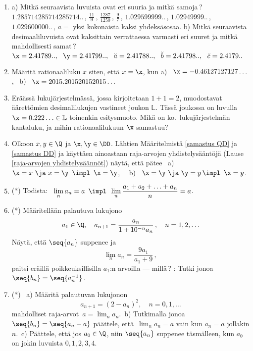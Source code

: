 \begin{enumerate}
\item 
a) Mitkä seuraavista luvuista ovat eri suuria ja mitkä samoja\,? \newline
$1.285714285714285714..\,$, $\frac{11}{9}\,$, $\frac{1287}{1250}\,$, $\frac{9}{7}\,$, 
$1.029599999..\,$, $1.02949999..\,$, \newline
$1.029600000..\,$, $a=$ yksi kokonaista kaksi yhdeksäsosaa. \vspace{2mm}\newline
b) Mitkä seuraavista desimaaliluvuista ovat kaksittain verrattaessa varmasti eri suuret ja mitkä
mahdollisesti samat\,? \newline
$\x=2.41789..,\ \ \y=2.41799..,\ \ \breve{a}=2.41788..,\ \ \breve{b}=2.41798.., \ \ 
 \breve{c}=2.4179..$

\item
Määritä rationaaliluku $x$ siten, että $x=\x$, kun \newline
a) \ $\x=-0.46127127127 \ldots\,$, \ b) \ $\x=2015.201520152015 \ldots$

\item
Eräässä lukujärjestelmässä, jossa kirjoitetaan $1+1=2$, muodostavat äärettömien desimalilukujen
vastineet joukon $\mathbb L$. Tässä joukossa on luvulla $\x=0.222\ldots \in \mathbb L$ toinenkin
esitysmuoto. Mikä on ko.\ lukujärjestelmän kantaluku, ja mihin rationaalilukuun $\x$ samastuu?

\item 
Olkoon $x,y\in\Q$ ja $\x,\y\in\DD$. Lähtien Määritelmistä \ref{samastus QD} ja \ref{samastus DD}
ja käyttäen ainoastaan raja-arvojen yhdistelysääntöjä 
(Lause \ref{raja-arvojen yhdistelysäännöt}) näytä, että pätee \
a) \ $\x=x\ \ja\ x=\y\ \,\impl\,\ \x=\y$, \ \ b) \  $\x=\y\ \ja\ \y=y \,\impl\,\ \x=y$.

\item (*)
Todista: \ 
$\displaystyle{\lim_n a_n = a\,\ \impl\,\ \lim_n \frac{a_1+a_2+ \ldots + a_n}{n} = a}$.

\item (*)
Määritellään palautuva lukujono
\[
a_1\in\Q, \quad a_{n+1}=\frac{a_n}{1+10^{-n}a_n}\,, \quad n=1,2, \ldots
\]
Näytä, että $\seq{a_n}$ suppenee ja
\[
\lim_n a_n = \frac{9a_1}{a_1+9}\,, 
\]
paitsi eräillä poikkeuksillisilla $a_1$:n arvoilla --- millä\,? \newline
\kor{Vihje}: Tutki jonoa $\seq{b_n}=\seq{a_n^{-1}}$\,.

\item (*)
\ a) Määritä palautuvan lukujonon
\[
a_{n+1}=(2-a_n)^2, \quad n=0,1, \ldots
\]
mahdolliset raja-arvot $\,a=\lim_n a_n$.\, b) Tutkimalla jonoa $\seq{b_n}=\seq{a_n-a}$ päättele,
että $\,\lim_n a_n = a$ vain kun $a_n=a$ jollakin $n$.\, c) Päättele, että jos $a_0\in\Q$, niin
$\seq{a_n}$ suppenee täsmälleen, kun $a_0$ on jokin luvuista $0,1,2,3,4$.

\end{enumerate}